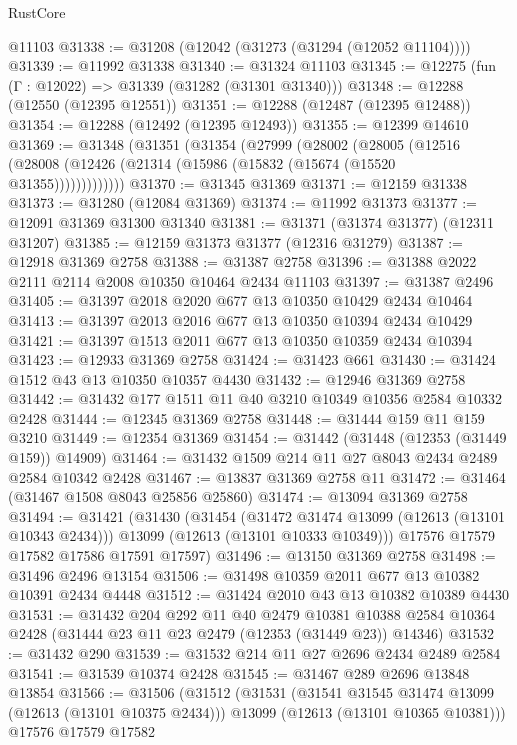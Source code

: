 \begin{lexlean}{RustCore}
\begin{coremodule}
    @11103
@31338 := @31208 (@12042 (@31273 (@31294 (@12052 @11104))))
@31339 := @11992 @31338
@31340 := @31324 @11103
@31345 := @12275 (fun (Γ : @12022) => @31339 (@31282 (@31301 @31340)))
@31348 := @12288 (@12550 (@12395 @12551))
@31351 := @12288 (@12487 (@12395 @12488))
@31354 := @12288 (@12492 (@12395 @12493))
@31355 := @12399 @14610
@31369 := @31348
    (@31351
      (@31354
        (@27999
          (@28002
            (@28005
              (@12516 (@28008 (@12426 (@21314 (@15986 (@15832 (@15674 (@15520 @31355)))))))))))))
@31370 := @31345 @31369
@31371 := @12159 @31338
@31373 := @31280 (@12084 @31369)
@31374 := @11992 @31373
@31377 := @12091 @31369 @31300 @31340
@31381 := @31371 (@31374 @31377) (@12311 @31207)
@31385 := @12159 @31373 @31377 (@12316 @31279)
@31387 := @12918 @31369 @2758
@31388 := @31387 @2758
@31396 := @31388 @2022 @2111 @2114 @2008 @10350 @10464 @2434 @11103
@31397 := @31387 @2496
@31405 := @31397 @2018 @2020 @677 @13 @10350 @10429 @2434 @10464
@31413 := @31397 @2013 @2016 @677 @13 @10350 @10394 @2434 @10429
@31421 := @31397 @1513 @2011 @677 @13 @10350 @10359 @2434 @10394
@31423 := @12933 @31369 @2758
@31424 := @31423 @661
@31430 := @31424 @1512 @43 @13 @10350 @10357 @4430
@31432 := @12946 @31369 @2758
@31442 := @31432 @177 @1511 @11 @40 @3210 @10349 @10356 @2584 @10332 @2428
@31444 := @12345 @31369 @2758
@31448 := @31444 @159 @11 @159 @3210
@31449 := @12354 @31369
@31454 := @31442 (@31448 (@12353 (@31449 @159)) @14909)
@31464 := @31432 @1509 @214 @11 @27 @8043 @2434 @2489 @2584 @10342 @2428
@31467 := @13837 @31369 @2758 @11
@31472 := @31464 (@31467 @1508 @8043 @25856 @25860)
@31474 := @13094 @31369 @2758
@31494 := @31421
    (@31430
      (@31454
        (@31472 @31474 @13099 (@12613 (@13101 @10343 @2434)))
        @13099
        (@12613 (@13101 @10333 @10349)))
      @17576
      @17579
      @17582
      @17586
      @17591
      @17597)
@31496 := @13150 @31369 @2758
@31498 := @31496 @2496 @13154
@31506 := @31498 @10359 @2011 @677 @13 @10382 @10391 @2434 @4448
@31512 := @31424 @2010 @43 @13 @10382 @10389 @4430
@31531 := @31432
    @204
    @292
    @11
    @40
    @2479
    @10381
    @10388
    @2584
    @10364
    @2428
    (@31444 @23 @11 @23 @2479 (@12353 (@31449 @23)) @14346)
@31532 := @31432 @290
@31539 := @31532 @214 @11 @27 @2696 @2434 @2489 @2584
@31541 := @31539 @10374 @2428
@31545 := @31467 @289 @2696 @13848 @13854
@31566 := @31506
    (@31512
      (@31531
        (@31541 @31545 @31474 @13099 (@12613 (@13101 @10375 @2434)))
        @13099
        (@12613 (@13101 @10365 @10381)))
      @17576
      @17579
      @17582

\end{coremodule}
\end{lexlean}
